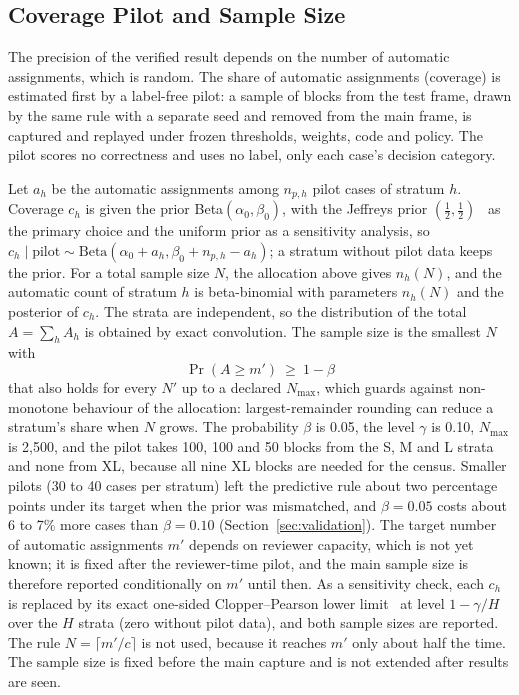\subsection{Coverage Pilot and Sample Size}
\label{sec:pilot}
The precision of the verified result depends on the number of automatic assignments, which is random. The share of automatic assignments (coverage) is estimated first by a label-free pilot: a sample of blocks from the test frame, drawn by the same rule with a separate seed and removed from the main frame, is captured and replayed under frozen thresholds, weights, code and policy. The pilot scores no correctness and uses no label, only each case's decision category.

Let $a_h$ be the automatic assignments among $n_{p,h}$ pilot cases of stratum $h$. Coverage $c_h$ is given the prior Beta$(\alpha_0,\beta_0)$, with the Jeffreys prior $(\tfrac12,\tfrac12)$~\cite{jeffreys1946} as the primary choice and the uniform prior as a sensitivity analysis, so $c_h\mid\text{pilot}\sim\text{Beta}(\alpha_0+a_h,\beta_0+n_{p,h}-a_h)$; a stratum without pilot data keeps the prior. For a total sample size $N$, the allocation above gives $n_h(N)$, and the automatic count of stratum $h$ is beta-binomial with parameters $n_h(N)$ and the posterior of $c_h$. The strata are independent, so the distribution of the total $A=\sum_h A_h$ is obtained by exact convolution. The sample size is the smallest $N$ with
\[
\Pr(A\ge m')\ \ge\ 1-\beta
\]
that also holds for every $N'$ up to a declared $N_{\max}$, which guards against non-monotone behaviour of the allocation: largest-remainder rounding can reduce a stratum's share when $N$ grows. The probability $\beta$ is 0.05, the level $\gamma$ is 0.10, $N_{\max}$ is 2,500, and the pilot takes 100, 100 and 50 blocks from the S, M and L strata and none from XL, because all nine XL blocks are needed for the census. Smaller pilots (30 to 40 cases per stratum) left the predictive rule about two percentage points under its target when the prior was mismatched, and $\beta=0.05$ costs about 6 to 7\% more cases than $\beta=0.10$ (Section~\ref{sec:validation}). The target number of automatic assignments $m'$ depends on reviewer capacity, which is not yet known; it is fixed after the reviewer-time pilot, and the main sample size is therefore reported conditionally on $m'$ until then. As a sensitivity check, each $c_h$ is replaced by its exact one-sided Clopper--Pearson lower limit~\cite{clopper1934} at level $1-\gamma/H$ over the $H$ strata (zero without pilot data), and both sample sizes are reported. The rule $N=\lceil m'/c\rceil$ is not used, because it reaches $m'$ only about half the time. The sample size is fixed before the main capture and is not extended after results are seen.

